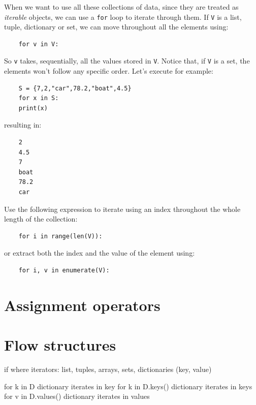 When we want to use all these collections of data, since they are treated as \textit{iterable} objects, we can use a \texttt{for} loop to iterate through them. 
If \texttt{V} is a list, tuple, dictionary or set, we can move throughout all the elements using:
\begin{verbatim}
    for v in V:
\end{verbatim}
So \texttt{v} takes, sequentially, all the values stored in \texttt{V}. 
Notice that, if \texttt{V} is a set, the elements won't follow any specific order. 
Let's execute for example:
\begin{verbatim}
    S = {7,2,"car",78.2,"boat",4.5}
    for x in S:
    print(x)
\end{verbatim}
resulting in:
\begin{verbatim}
    2
    4.5
    7
    boat
    78.2
    car
\end{verbatim}
Use the following expression to iterate using an index throughout the whole length of the collection:
\begin{verbatim}
    for i in range(len(V)): 
\end{verbatim}
or extract both the index and the value of the element using:
\begin{verbatim}
    for i, v in enumerate(V):
\end{verbatim}











    \section{Assignment operators}






    \section{Flow structures}

if 
where 
iterators: list, tuples, arrays, sets, dictionaries (key, value)



for k in D   dictionary iterates in key 
for k in D.keys()   dictionary iterates in keys
for v in D.values()   dictionary iterates in values


\newpage 
